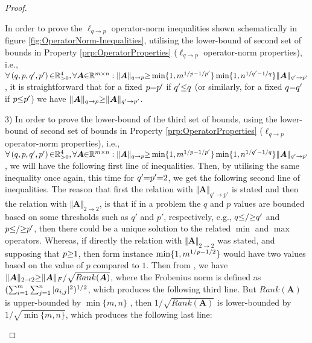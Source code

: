 \begin{proof}
\begin{itemize}
In order to prove the $\ell_{q {\to} p}$ operator-norm inequalities shown schematically in figure \ref{fig:OperatorNorm-Inequalities}, utilising the lower-bound of second set of bounds in Property \ref{prp:OperatorProperties} ($\ell_{q {\to} p}$ operator-norm properties), i.e., $\forall \left( q , p , q' , p' \right) {\in} \mathbb{R}^4_{>0} , \forall \boldsymbol{A} {\in} \mathbb{R}^{m {\times} n} : \Vert \boldsymbol{A} \Vert_{q \to p} {\geq} \min \{1 , m^{1/p {-} 1/{p'}} \} \min \{1 , n^{1/{q'} {-} 1/q} \} \Vert \boldsymbol{A} \Vert_{q' \to p'}$, it is straightforward that for a fixed $p {=} p'$ if $q' {\leq} q$ (or similarly, for a fixed $q {=} q'$ if $p {\leq} p'$) we have $\Vert \boldsymbol{A} \Vert_{q \to p} {\geq} \Vert \boldsymbol{A} \Vert_{q' \to p'}$.

3) In order to prove the lower-bound of the third set of bounds, using the lower-bound of second set of bounds in Property \ref{prp:OperatorProperties} ($\ell_{q {\to} p}$ operator-norm properties), i.e., $\forall \left( q , p , q' , p' \right) {\in} \mathbb{R}^4_{>0} , \forall \boldsymbol{A} {\in} \mathbb{R}^{m {\times} n} : \Vert \boldsymbol{A} \Vert_{q \to p} {\geq} \min \{1 , m^{1/p {-} 1/{p'}} \} \min \{1 , n^{1/{q'} {-} 1/q} \} \Vert \boldsymbol{A} \Vert_{q' \to p'}$, we will have the following first line of inequalities.
Then, by utilising the same inequality once again, this time for $q' {=} p' {=} 2$, we get the following second line of inequalities.
The reason that first the relation with $\Vert \boldsymbol{A} \Vert_{q' \to p'}$ is stated and then the relation with $\Vert \boldsymbol{A} \Vert_{2 \to 2}$, is that if in a problem the $q$ and $p$ values are bounded based on some thresholds such as $q'$ and $p'$, respectively, e.g., $q {\leq} / {\geq} q'$ and $p {\leq} / {\geq} p'$, then there could be a unique solution to the related $\min$ and $\max$ operators.
Whereas, if directly the relation with $\Vert \boldsymbol{A} \Vert_{2 \to 2}$ was stated, and supposing that $p {\geq} 1$, then form instance $\min \{1 , m^{1/p {-} 1/{2}} \}$ would have two values based on the value of $p$ compared to $1$.
Then from \cite{Golub2013}, we have $\Vert \boldsymbol{A} \Vert_{2 \to 2} {\geq} \Vert \boldsymbol{A} \Vert_F / \sqrt{Rank(\boldsymbol{A})}$, where the Frobenius norm is defined as $(\sum_{i {=} 1}^m \sum_{j {=} 1}^n |a_{i,j}|^2)^{1/2}$, which produces the following third line.
But $Rank(\boldsymbol{A})$ is upper-bounded by $\min \{ m , n \}$ \cite{Golub2013}, then  $1/ \sqrt{Rank(\boldsymbol{A})}$ is lower-bounded by $1/ \sqrt{\min \{ m , n \}}$, which produces the following last line:

\end{itemize}
\end{proof}
